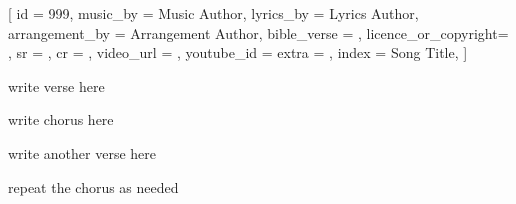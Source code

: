 [
    id                  = {999},
    music_by            = {Music Author},
    lyrics_by           = {Lyrics Author},
    arrangement_by      = {Arrangement Author},
    bible_verse         = {},
    licence_or_copyright= {},
    sr                  = {},
    cr                  = {},
    video_url           = {}, %
    youtube_id          = {} %
    extra               = {},
    index               = {Song Title},
]

\beginverse
write verse here
\endverse

\beginchorus
write chorus here
\endchorus

\beginverse
write another verse here
\endverse

\beginchorus
repeat the chorus as needed
\endchorus

\endsong
